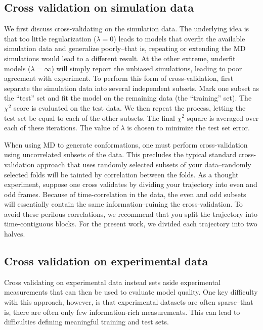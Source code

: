 \documentclass[12pt]{article}
\begin{document}
\subsection*{Cross validation on simulation data}

We first discuss cross-validating on the simulation data.  The underlying idea is that too little regularization ($\lambda = 0$) leads to models that overfit the available simulation data and generalize poorly--that is, repeating or extending the MD simulations would lead to a different result.  At the other extreme, underfit models ($\lambda = \infty$) will simply report the unbiased simulations, leading to poor agreement with experiment.  To perform this form of cross-validation, first separate the simulation data into several independent subsets.  Mark one subset as the ``test'' set and fit the model on the remaining data (the ``training'' set).  The $\chi^2$ score is evaluated on the test data.  We then repeat the process, letting the test set be equal to each of the other subsets.  The final $\chi^2$ square is averaged over each of these iterations.  The value of $\lambda$ is chosen to minimize the test set error.

When using MD to generate conformations, one must perform cross-validation using uncorrelated subsets of the data.  This precludes the typical standard cross-validation approach that uses randomly selected subsets of your data--randomly selected folds will be tainted by correlation between the folds.  As a thought experiment, suppose one cross validates by dividing your trajectory into even and odd frames.  Because of time-correlation in the data, the even and odd subsets will essentially contain the same information--ruining the cross-validation.  To avoid these perilous correlations, we recommend that you split the trajectory into time-contiguous blocks.  For the present work, we divided each trajectory into two halves.  

\subsection*{Cross validation on experimental data}

Cross validating on experimental data instead sets aside experimental measurements that can then be used to evaluate model quality.  One key difficulty with this approach, however, is that experimental datasets are often sparse--that is, there are often only few information-rich measurements.  This can lead to difficulties defining meaningful training and test sets.  
\end{document}
